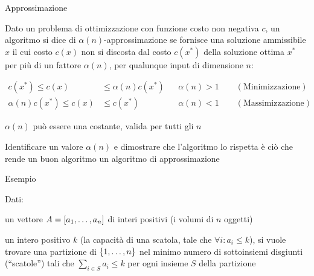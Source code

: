 \begin{frame}{Approssimazione}

\vspace{-9pt}
\begin{myboxtitle}[Definizione]
Dato un problema di ottimizzazione con funzione costo non negativa $c$,
un algoritmo si dice di \alert{$\alpha(n)$-approssimazione} se fornisce una soluzione ammissibile $x$ il cui costo $c(x)$ non si discosta dal costo $c(x^*)$ della soluzione ottima $x^*$ per più di un fattore $\alpha(n)$,
per qualunque input di dimensione $n$:

\begin{align*}
c(x^*) \leq c(x) & \leq \alpha(n) c(x^*)  && \alpha(n) > 1 \qquad (\textrm{Minimizzazione})\\
\alpha(n) c(x^*) \leq c(x) & \leq c(x^*)  && \alpha(n) < 1 \qquad (\textrm{Massimizzazione})
\end{align*}
\end{myboxtitle}

\BIL
\item $\alpha(n)$ può essere una costante, valida per tutti gli $n$
\item Identificare un valore $\alpha(n)$ e dimostrare che l'algoritmo lo rispetta è ciò che rende un buon algoritmo un algoritmo di approssimazione
\EIL


\end{frame}


\begin{frame}{Esempio}

\vspace{-9pt}
\begin{myboxtitle}
Dati:
\BI
\item un vettore $A = [a_1, \ldots, a_n]$ di interi positivi (i \alert{volumi}
di $n$ \alert{oggetti}) 
\item un intero positivo $k$ (la \alert{capacità} di una \alert{scatola}, tale che $\forall i: a_i \leq k$), 
\EI
si vuole trovare una partizione di $\{1, \ldots, n\}$ nel minimo numero di sottoinsiemi disgiunti (``scatole'') tali che $\sum_{i\in S} a_i \le k$ per ogni insieme $S$ della partizione
\end{myboxtitle}

\vspace{-9pt}

\end{frame}

